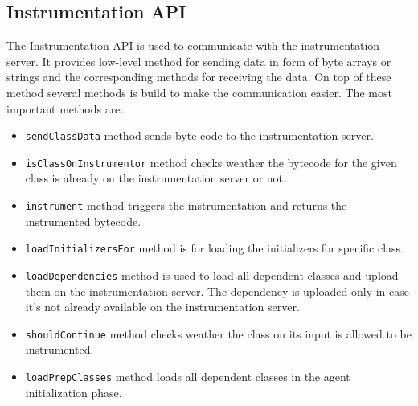 \subsection{Instrumentation API}
The Instrumentation API is used to communicate with the instrumentation server. It provides low-level method for sending data in form of byte arrays or strings and the corresponding methods for receiving the data. On top of these method several methods is build to make the communication easier. The most important methods are:
\begin{itemize}
	\item \texttt{sendClassData} method sends byte code to the instrumentation server.
	\item \texttt{isClassOnInstrumentor} method checks weather the bytecode for the given class is already on the instrumentation server or not.
	\item \texttt{instrument} method triggers the instrumentation and returns the instrumented bytecode.
	\item \texttt{loadInitializersFor} method is for loading the initializers for specific class.
	\item \texttt{loadDependencies} method is used to load all dependent classes and upload them on the instrumentation server. The dependency is uploaded only in case it's not already available on the instrumentation server.
	\item \texttt{shouldContinue} method checks weather the class on its input is allowed to be instrumented.
	\item \texttt{loadPrepClasses} method loads all dependent classes in the agent initialization phase.
\end{itemize}

